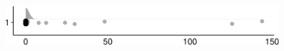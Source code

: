 \documentclass[
]{article}
\begin{document}
\begin{minipage}[t]{0.3\linewidth}

~

\end{minipage}%
\begin{minipage}[t]{0.7\linewidth}

\includegraphics[width=396px]{codebook_template_files/figure-latex/q7_34_rainplot-1}

\end{minipage}
 \vspace*{-5mm} 

\begin{minipage}[t]{0.3\linewidth}

~

\end{minipage}%
\begin{minipage}[t]{0.7\linewidth}

~

\end{minipage}
 \vspace*{-7mm} 
\end{document}
